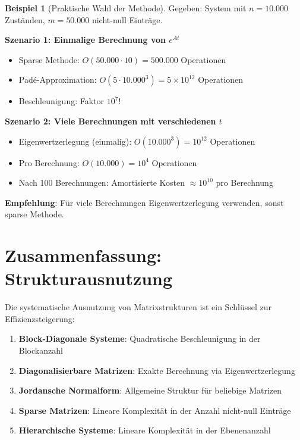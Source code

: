 ﻿\documentclass[a4paper,12pt]{report}
\theoremstyle{definition}
\newtheorem{beispiel}{Beispiel}
\begin{document}
	\begin{beispiel}[Praktische Wahl der Methode]
		Gegeben: System mit $n = 10.000$ Zuständen, $m = 50.000$ nicht-null Einträge.
		
		\textbf{Szenario 1: Einmalige Berechnung von $e^{At}$}
		\begin{itemize}
			\item Sparse Methode: $O(50.000 \cdot 10) = 500.000$ Operationen
			\item Padé-Approximation: $O(5 \cdot 10.000^3) = 5 \times 10^{12}$ Operationen
			\item Beschleunigung: Faktor $10^7$!
		\end{itemize}
		
		\textbf{Szenario 2: Viele Berechnungen mit verschiedenen $t$}
		\begin{itemize}
			\item Eigenwertzerlegung (einmalig): $O(10.000^3) = 10^{12}$ Operationen
			\item Pro Berechnung: $O(10.000) = 10^4$ Operationen
			\item Nach 100 Berechnungen: Amortisierte Kosten $\approx 10^{10}$ pro Berechnung
		\end{itemize}
		
		\textbf{Empfehlung}: Für viele Berechnungen Eigenwertzerlegung verwenden, sonst sparse Methode.
	\end{beispiel}
	
	\section{Zusammenfassung: Strukturausnutzung}
	
	Die systematische Ausnutzung von Matrixstrukturen ist ein Schlüssel zur Effizienzsteigerung:
	
	\begin{enumerate}
		\item \textbf{Block-Diagonale Systeme}: Quadratische Beschleunigung in der Blockanzahl
		\item \textbf{Diagonalisierbare Matrizen}: Exakte Berechnung via Eigenwertzerlegung
		\item \textbf{Jordansche Normalform}: Allgemeine Struktur für beliebige Matrizen
		\item \textbf{Sparse Matrizen}: Lineare Komplexität in der Anzahl nicht-null Einträge
		\item \textbf{Hierarchische Systeme}: Lineare Komplexität in der Ebenenanzahl
	\end{enumerate}
	
\end{document}
